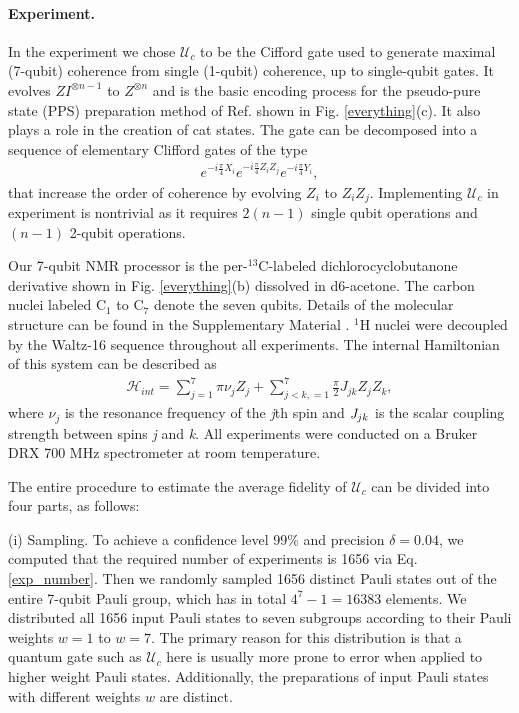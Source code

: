 \documentclass[prl,twocolumn,showpacs,superscriptaddress]{revtex4-1}
\newcommand{\ket}[1]{|#1\rangle}
\begin{document}
\paragraph*{Experiment.}
In the experiment we chose  $\mathcal{U}_{c}$ to be the Cifford gate used  to generate  maximal (7-qubit) coherence from single (1-qubit) coherence, up to single-qubit gates. It evolves $ZI^{\otimes n-1}$ to $Z^{\otimes n}$ and is the basic encoding process  for the pseudo-pure state (PPS) preparation method of Ref. \cite{Knill2000} shown in Fig. \ref{everything}(c). It  also plays a role  in  the creation of cat states. %
 The gate can be decomposed into a sequence of elementary Clifford gates of the type
\begin{align} \label{decomp}
e^{-i\frac{\pi}{4}X_i}e^{-i\frac{\pi}{4}Z_i Z_j} e^{-i\frac{\pi}{4}Y_i},
\end{align}
that  increase the order of coherence by evolving $Z_i$ to $Z_i Z_j$. Implementing $\mathcal{U}_{c}$  in experiment is nontrivial as it requires $2(n-1)$ single qubit operations and $(n-1)$ 2-qubit operations.

Our 7-qubit NMR processor is the per-$^{13}$C-labeled dichlorocyclobutanone derivative \cite{Johnson2008} shown in Fig. \ref{everything}(b) dissolved in
d6-acetone. The carbon nuclei labeled C$_1$ to C$_7$ denote the seven qubits.  Details of the molecular structure can be found in the Supplementary Material \cite{supplement}. $^1$H nuclei were decoupled by the Waltz-16 sequence throughout all experiments. The internal Hamiltonian of this system can be described as
\begin{align}\label{Hamiltonian}
\mathcal{H}_{int}=\sum\limits_{j=1}^7 {\pi \nu _j } Z_j  + \sum\limits_{j < k,=1}^7 {\frac{\pi}{2}} J_{jk} Z_j Z_k,
\end{align}
where $\nu_j$ is the resonance frequency of the \emph{j}th spin and $\emph{J}_{jk}$ is the scalar coupling strength between spins \emph{j} and \emph{k}. All experiments were conducted on a Bruker DRX 700 MHz spectrometer at room temperature.%

The entire procedure to estimate the average fidelity of $\mathcal{U}_{c}$ can be divided into four parts, as follows:

(i) Sampling. To achieve a confidence level 99\% and precision $\delta = 0.04$, we computed that the required number of experiments is 1656 via Eq. \eqref{exp_number}. Then we randomly sampled  1656 distinct Pauli states out of the entire 7-qubit Pauli group, which has in total $4^7-1=16383$ elements. We distributed all 1656 input Pauli states to seven subgroups according to their Pauli weights $w=1$ to $w=7$. The primary reason for this distribution is that a quantum gate such as $\mathcal{U}_{c}$ here is usually more prone to error when applied to higher weight Pauli states. Additionally, the preparations of input Pauli states with different weights $w$ are distinct.
\end{document}
